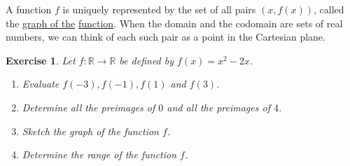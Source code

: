 \documentclass[12pt]{article}
\newtheorem{ex}{Exercise}[section]
\begin{document}
A function $f$ is uniquely represented by the set of all pairs $(x,f(x))$, called the \underline{graph of the} \underline{function}. When the domain and the codomain are sets of real numbers, we can think of each such pair as a point in the Cartesian plane.

\begin{ex}
Let $f:\mathbb{R}\to \mathbb{R}$ be defined by $f(x)=x^{2}-2x$.
\begin{enumerate}
\item[a)]  Evaluate $f(-3), f(-1), f(1)$ and $f(3)$.
\item[b)] Determine all the preimages of $0$ and all the preimages of $4$.
\item[c)] Sketch the graph of the function $f$.
\item[d)] Determine the range of the function $f$.
\end{enumerate}
\end{ex}
\end{document}
